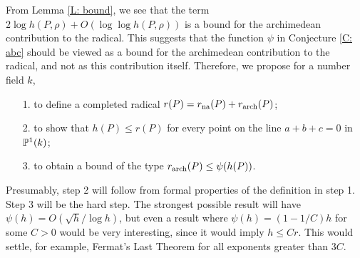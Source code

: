 \documentclass{amsart}
\newcommand\arch{{\textup{arch}}}	\newcommand\na{{\textup{na}}}
\theoremstyle{definition}\newtheorem{definition}[theorem]{Definition}
\theoremstyle{remark}\newtheorem{remark}[theorem]{Remark}
\numberwithin{equation}{section}
\begin{document}
From Lemma \ref{L: bound},
we see that the term $2\log h(P,\rho)+O(\log\log h(P,\rho))$ is a bound for the archimedean contribution to the radical.
This suggests that the function $\psi$ in Conjecture \ref{C: abc} should be viewed as
a bound for the archimedean contribution to the radical,
and not as this contribution itself.
Therefore,
we propose for a number field $k$,
\begin{itemize}
\item[1.]
to define a completed radical $r(P)=r_\na(P)+r_\arch(P)$;
\item[2.]
to show that $h(P)\leq r(P)$ for every point on the line $a+b+c=0$ in $\mathbb{P}^1(k)$;
\item[3.]
to obtain a bound of the type $r_\arch(P)\leq\psi(h(P))$.
\end{itemize}
Presumably,
step 2 will follow from formal properties of the definition in step 1.
Step 3 will be the hard step.
The strongest possible result will have $\psi(h)=O(\sqrt h/\log h)$,
but even a result where $\psi(h)=(1-1/C)h$ for some $C>0$ would be very interesting,
since it would imply $h\leq Cr$.
This would settle,
for example,
Fermat's Last Theorem for all exponents greater than $3C$.
\end{document}
